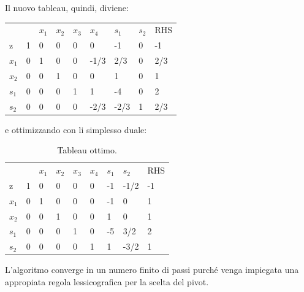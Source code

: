 Il nuovo tableau, quindi, diviene:
\begin{table}[!h]
	\centering
	\begin{tabular}{lllllllll}
				&       				  & $x_{1}$ & $x_{2}$  & $x_{3}$ & $x_{4}$ & $s_{1}$ & $s_{2}$ &  RHS  \\ \cline{2-9}
		z		& \multicolumn{1}{|l|}{1} & 0       & 0        & 0       & 0       & -1      & 0	   & \multicolumn{1}{|l|}{-1} \\ \cline{2-9}
		$x_{1}$ & \multicolumn{1}{|l|}{0} & 1       & 0        & 0       & -1/3    & 2/3     & 0       & \multicolumn{1}{|l|}{2/3} \\
		$x_{2}$ & \multicolumn{1}{|l|}{0} & 0       & 1        & 0       & 0       & 1       & 0       & \multicolumn{1}{|l|}{1} \\
		$s_{1}$ & \multicolumn{1}{|l|}{0} & 0       & 0        & 1       & 1       & -4      & 0       & \multicolumn{1}{|l|}{2} \\
		$s_{2}$ & \multicolumn{1}{|l|}{0} & 0       & 0        & 0       & -2/3    & -2/3    & 1       & \multicolumn{1}{|l|}{2/3} \\ \cline{2-9}
	\end{tabular}
\end{table}

e ottimizzando con li simplesso duale:
\begin{table}[!h]
	\centering
	\begin{tabular}{lllllllll}
				&       				  & $x_{1}$ & $x_{2}$  & $x_{3}$ & $x_{4}$ & $s_{1}$ & $s_{2}$ &  RHS  \\ \cline{2-9}
		z		& \multicolumn{1}{|l|}{1} & 0       & 0        & 0       & 0       & -1      & -1/2	   & \multicolumn{1}{|l|}{-1} \\ \cline{2-9}
		$x_{1}$ & \multicolumn{1}{|l|}{0} & 1       & 0        & 0       & 0       & -1      & 0       & \multicolumn{1}{|l|}{1} \\
		$x_{2}$ & \multicolumn{1}{|l|}{0} & 0       & 1        & 0       & 0       & 1       & 0       & \multicolumn{1}{|l|}{1} \\
		$s_{1}$ & \multicolumn{1}{|l|}{0} & 0       & 0        & 1       & 0       & -5      & 3/2     & \multicolumn{1}{|l|}{2} \\
		$s_{2}$ & \multicolumn{1}{|l|}{0} & 0       & 0        & 0       & 1       & 1       & -3/2    & \multicolumn{1}{|l|}{1} \\ \cline{2-9}
	\end{tabular}
	\caption{Tableau ottimo.}
\end{table}
\noindent
L'algoritmo converge in un numero finito di passi purché venga impiegata una appropiata regola lessicografica per la scelta del pivot.

